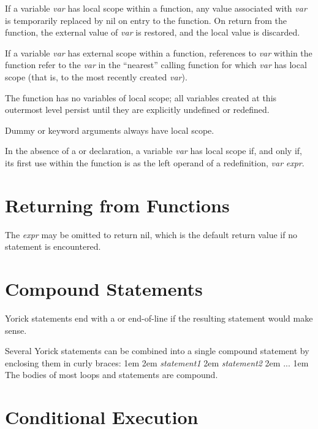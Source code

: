 If a variable {\it var} has local scope within a function, any value
associated with {\it var} is temporarily replaced by nil on entry to
the function.  On return from the function, the external value of {\it
var} is restored, and the local value is discarded.

If a variable {\it var} has external scope within a function,
references to {\it var} within the function refer to the {\it var} in
the ``nearest'' calling function for which {\it var} has local scope
(that is, to the most recently created {\it var}).

The  function has no variables of local scope; all
variables created at this outermost level persist until they are
explicitly undefined or redefined.

Dummy or keyword arguments always have local scope.

In the absence of a  or  declaration, a variable
{\it var} has local scope if, and only if, its first use within the
function is as the left operand of a redefinition, {\it var\/}\kbd{=}
{\it expr}.

\section{Returning from Functions}

The {\it expr} may be omitted to return nil, which is the default
return value if no  statement is encountered.


\section{Compound Statements}

Yorick statements end with a \kbd{;} or end-of-line if the resulting
statement would make sense.

Several Yorick statements can be combined into a single compound
statement by enclosing them in curly braces:
\begindemo
\hglue1em \kbd{\{}
\hglue2em {\it statement1}
\hglue2em {\it statement2}
\hglue2em ...
\hglue1em \kbd{\}}
\enddemo
The bodies of most loops and  statements are compound.

\section{Conditional Execution}

